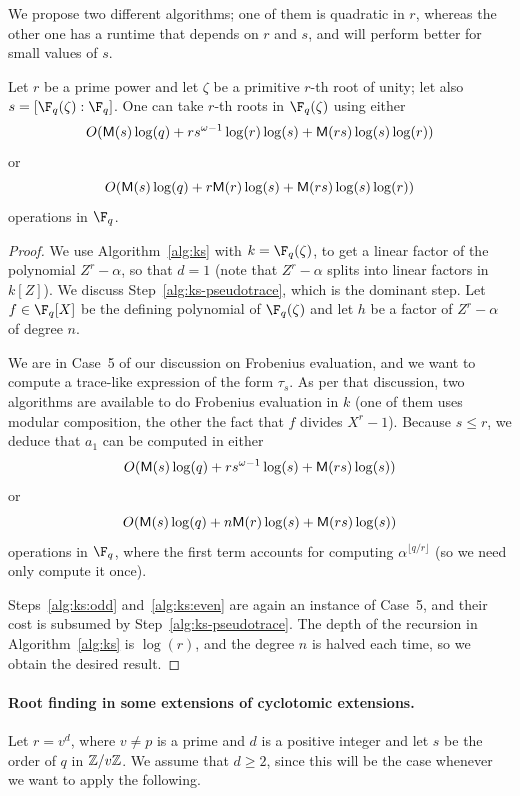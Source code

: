 We propose two different algorithms; one of them is quadratic in $r$,
whereas the other one has a runtime that depends on $r$ and $s$,
and will perform better for small values of $s$.

\begin{proposition}
  \label{prop:root-fpz}
  Let $r$ be a prime power and let $\zeta$ be a primitive $r$-th root of unity; let also $s = 
  [\F_q(\zeta): \F_q]$. One can take $r$-th roots in 
  $\F_q(\zeta)$ using either 
  $$O(\mathsf{M}(s)\log(q) + rs^{\omega-1}\log(r)\log(s) + \mathsf{M}(rs)\log(s)\log(r))$$
  or
  $$O(\mathsf{M}(s)\log(q) + r\mathsf{M}(r)\log(s) + \mathsf{M}(rs)\log(s)\log(r))$$ operations in $\F_q$. 
\end{proposition}
\begin{proof}
We use Algorithm~\ref{alg:ks} with $k=\F_q(\zeta)$, to get a linear
factor of the polynomial $Z^r-\alpha$, so that $d=1$ (note that
$Z^r-\alpha$ splits into linear factors in $k[Z]$). We discuss
Step~\ref{alg:ks-pseudotrace}, which is the dominant step. Let $f \in
\F_q[X]$ be the defining polynomial of $\F_q(\zeta)$ and let $h$ be a
factor of $Z^r-\alpha$ of degree $n$. 

We are in Case~5 of our discussion on Frobenius evaluation, and we
want to compute a trace-like expression of the form $\tau_s$. As per
that discussion, two algorithms are available to do Frobenius
evaluation in $k$ (one of them uses modular composition, the other the
fact that $f$ divides $X^r-1$). Because $s \le r$, we deduce that
$a_1$ can be computed in either
$$O(\mathsf{M}(s)\log(q) + rs^{\omega-1}\log(s) + \mathsf{M}(rs)\log(s))$$
or
$$O(\mathsf{M}(s)\log(q) + n\mathsf{M}(r)\log(s) + \mathsf{M}(rs)\log(s))$$ operations in
$\F_q$, where the first term accounts for computing $\alpha^{\lfloor
  q/r \rfloor}$ (so we need only compute it once).

Steps~\ref{alg:ks:odd} and~\ref{alg:ks:even} are again an instance of
Case~5, and their cost is subsumed by Step~\ref{alg:ks-pseudotrace}.
The depth of the recursion in Algorithm~\ref{alg:ks} is $\log(r)$, and
the degree $n$ is halved each time, so we obtain the desired result.
\end{proof}

\paragraph{\bf Root finding in some extensions of cyclotomic extensions.}
Let $r = v^d$, where $v \ne p$ is a prime and $d$ is a positive
integer and let $s$ be the order of $q$ in $\mathbb{Z} / v\mathbb{Z}$.  We 
assume that $d \ge 2$, since this will be the case whenever we want to
apply the following.

